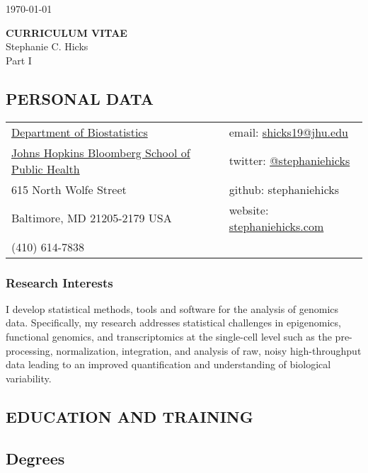 \documentclass[10pt]{article}
\begin{document}
\hfill \today

\begin{center}
{\bf CURRICULUM VITAE}\\
Stephanie C. Hicks\\[3mm]
Part I
\end{center}

\vspace*{10mm}

\subsection*{PERSONAL DATA}

%
\begin{tabular}[t]{L{12.5cm}R{5cm}}
\href{https://www.jhsph.edu/departments/biostatistics/}{Department of Biostatistics} & email: \href{mailto:shicks19@jhu.edu}{shicks19@jhu.edu} \\
\href{https://www.jhsph.edu}{Johns Hopkins Bloomberg School of Public Health} & twitter: \href{https://twitter.com/stephaniehicks}{@stephaniehicks} \\
615 North Wolfe Street  &  github: stephaniehicks \\
Baltimore, MD 21205-2179 USA & website: \href{http://www.stephaniehicks.com}{stephaniehicks.com} \\ 
(410) 614-7838  & 
\end{tabular}

\subsubsection*{Research Interests}

I develop statistical methods, tools and software for the analysis of genomics data. Specifically, my research addresses statistical challenges in epigenomics, functional genomics, and transcriptomics at the single-cell level such as the pre-processing, normalization, integration, and analysis of raw, noisy high-throughput data leading to an improved quantification and understanding of biological variability.

\subsection*{EDUCATION AND TRAINING}

\smallskip

\subsection*{Degrees}
\end{document}
